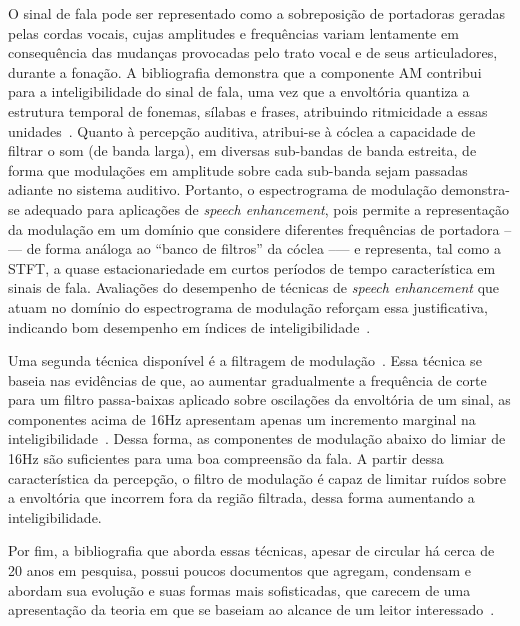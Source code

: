 O sinal de fala pode ser representado como a sobreposição de portadoras geradas
pelas cordas vocais, cujas amplitudes e frequências variam lentamente em
consequência das mudanças provocadas pelo trato vocal e de seus articuladores,
durante a fonação. A bibliografia demonstra que a componente AM contribui para a
inteligibilidade do sinal de fala, uma vez que a envoltória quantiza a estrutura
temporal de fonemas, sílabas e frases, atribuindo ritmicidade a essas
unidades~\cite{poeppel2020,varnet2017}. Quanto à percepção auditiva, atribui-se
à cóclea a capacidade de filtrar o som (de banda larga), em diversas sub-bandas
de banda estreita, de forma que modulações em amplitude sobre cada sub-banda
sejam passadas adiante no sistema auditivo. Portanto, o espectrograma de
modulação demonstra-se adequado para aplicações de \textit{speech enhancement},
pois permite a representação da modulação em um domínio que considere diferentes
frequências de portadora --— de forma análoga ao ``banco de filtros'' da cóclea
--— e representa, tal como a STFT, a quase estacionariedade em curtos períodos
de tempo característica em sinais de fala. Avaliações do desempenho de técnicas
de \textit{speech enhancement} que atuam no domínio do espectrograma de
modulação reforçam essa justificativa, indicando bom desempenho em índices de
inteligibilidade~\cite{schwerin2018}.

Uma segunda técnica disponível é a filtragem de modulação~\cite{atlas2005}. Essa
técnica se baseia nas evidências de que, ao aumentar gradualmente a frequência
de corte para um filtro passa-baixas aplicado sobre oscilações da envoltória de
um sinal, as componentes acima de 16Hz apresentam apenas um incremento marginal
na inteligibilidade~\cite{drullman1994}. Dessa forma, as componentes de
modulação abaixo do limiar de 16Hz são suficientes para uma boa compreensão da
fala. A partir dessa característica da percepção, o filtro de modulação é capaz
de limitar ruídos sobre a envoltória que incorrem fora da região filtrada, dessa
forma aumentando a inteligibilidade.


Por fim, a bibliografia que aborda essas técnicas, apesar de circular há cerca
de 20 anos em pesquisa, possui poucos documentos que agregam, condensam e
abordam sua evolução e suas formas mais sofisticadas, que carecem de uma
apresentação da teoria em que se baseiam ao alcance de um leitor
interessado~\cite{parchami2016,paliwal2015}.

\vspace{0.4cm}